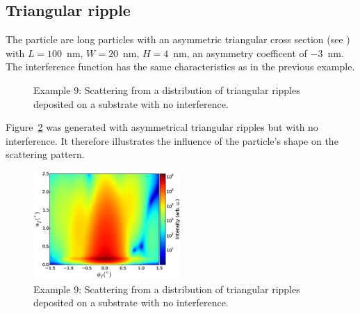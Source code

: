 \subsection{Triangular ripple}
 The particle are long particles with an asymmetric triangular cross section (see ) with  $L=100$~nm, $W=20$~nm, $H=4$~nm, an asymmetry coefficent of $-3$~nm. The interference function has the same characteristics as in the previous example.

\begin{figure}[H]
\hfill
{}
\hfill
{}
\hfill
\caption{Example 9: Scattering from a distribution of triangular ripples deposited on a substrate with no interference.}
\label{fig:PythonEx9TriangRipple}
\end{figure}

Figure~\ref{fig:PythonEx9TriRipplenointerf} was generated with asymmetrical triangular ripples but with no interference. It therefore illustrates the influence of the particle's shape on the scattering pattern.

\begin{figure}[H]
\begin{center}
\includegraphics[width=0.5\textwidth]{Figures/figure_ex009TriRippleNoInterf.eps}
\end{center}
\caption{Example 9: Scattering from a distribution of triangular ripples deposited on a substrate with no interference.}
\label{fig:PythonEx9TriRipplenointerf}
\end{figure}

